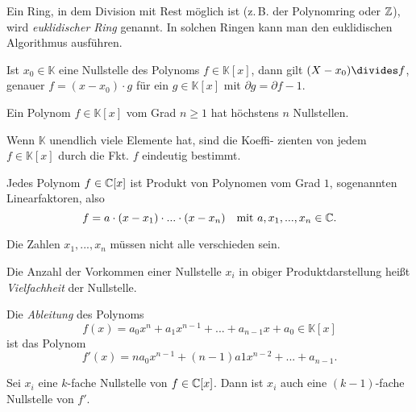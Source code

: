 \documentclass{cheat-sheet}
\newcommand{\K}{\mathbb{K}} %
\begin{document}
\begin{bem}
  Ein Ring, in dem Division mit Rest möglich ist (z.\,B. der Polynomring oder $\mathbb{Z}$), wird \emph{euklidischer Ring} genannt. In solchen Ringen kann man den euklidischen Algorithmus ausführen.
\end{bem}

\begin{satz}
  Ist $x_0 \in \K$ eine Nullstelle des Polynoms $f \in \K[x]$, dann gilt $(X - x_0) \divides f$, genauer $f = (x{-}x_0) \cdot g$ für ein $g {\in} \K[x]$ mit $\partial g = \partial f {-} 1$.
\end{satz}

\begin{kor}
  Ein Polynom $f \in \K[x]$ vom Grad $n \geq 1$ hat höchstens $n$ Nullstellen.
\end{kor}

\begin{kor}
  Wenn $\K$ unendlich viele Elemente hat, sind die Koeffi- zienten von jedem $f \in \K[x]$ durch die Fkt. $f$ eindeutig bestimmt.
\end{kor}

\begin{satz}
  Jedes Polynom $f \in \mathbb{C}[x]$ ist Produkt von Polynomen vom Grad $1$, sogenannten Linearfaktoren, also
  \[
    f = a \cdot (x - x_1) \cdot ... \cdot (x - x_n)
    \quad \text{mit $a, x_1, ..., x_n \in \mathbb{C}$}.
  \]
\end{satz}

\begin{bem}
  Die Zahlen $x_1, ..., x_n$ müssen nicht alle verschieden sein.
\end{bem}

\begin{defn}
  Die Anzahl der Vorkommen einer Nullstelle $x_i$ in obiger Produktdarstellung heißt \emph{Vielfachheit} der Nullstelle.
\end{defn}

\begin{defn}
  Die \emph{Ableitung} des Polynoms
  \[ f(x) = a_0 x^n + a_1 x^{n-1} + ... + a_{n-1} x + a_0 \in \K[x] \]
  ist das Polynom
  \[ f'(x) = n a_0 x^{n-1} + (n{-}1) a1 x^{n-2} + ... + a_{n-1}. \]
\end{defn}

\begin{bem}
  Sei $x_i$ eine $k$-fache Nullstelle von $f \in \mathbb{C}[x]$. Dann ist $x_i$ auch eine $(k{-}1)$-fache Nullstelle von $f'$.
\end{bem}
\end{document}
